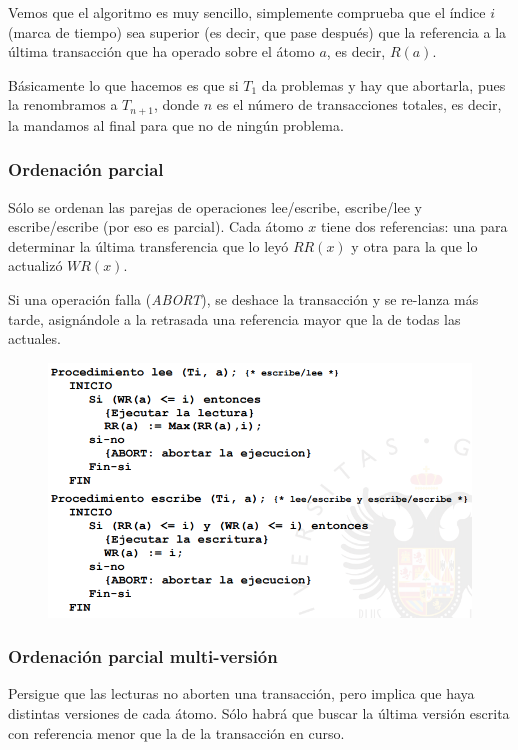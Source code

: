 Vemos que el algoritmo es muy sencillo, simplemente comprueba que el índice $i$ (marca de tiempo) sea superior (es decir, que pase después) que la referencia a la última transacción que ha operado sobre el átomo $a$, es decir, $R(a)$.

Básicamente lo que hacemos es que si $T_1$ da problemas y hay que abortarla, pues la renombramos a $T_{n+1}$, donde $n$ es el número de transacciones totales, es decir, la mandamos al final para que no de ningún problema.

\subsubsection{Ordenación parcial}

Sólo se ordenan las parejas de operaciones lee/escribe, escribe/lee y escribe/escribe (por eso es parcial). Cada átomo $x$ tiene dos referencias: una para determinar la última transferencia que lo leyó $RR(x)$ y otra para la que lo actualizó $WR(x)$. 

Si una operación falla (\textit{ABORT}), se deshace la transacción y se re-lanza más tarde, asignándole a la retrasada una referencia mayor que la de todas las actuales.

\begin{figure}[H]
  \center
  \includegraphics[scale=0.45]{img/42.png}
\end{figure}

\subsubsection{Ordenación parcial multi-versión}

Persigue que las lecturas no aborten una transacción, pero implica que haya distintas versiones de cada átomo. Sólo habrá que buscar la última versión escrita con referencia menor que la de la transacción en curso.

